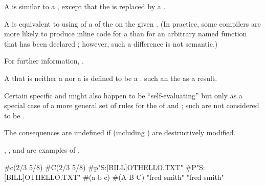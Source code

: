 \endsubsubsubsubsection%


A  is similar to a , except that
the  is replaced by a .

A  is equivalent to using  of a
 of the  on the given .
(In practice, some compilers are more likely to produce inline code 
for a  than for an arbitrary named function 
that has been declared ; however, such a difference
is not semantic.)

For further information, \seesection\LambdaExpressions.

\endsubsubsubsubsection%

\endsubsubsubsection%


A  that is neither a  nor a  is 
defined to be a .  
such an   the   
as a result.

Certain specific  and  might also happen 
to be ``self-evaluating'' but only as a special case of a more 
general set of rules for the  of  and
; such  are not considered to be
.

The consequences are undefined if  (including
) are destructively modified.


, , and  are examples of
.

 
 #c(2/3 5/8) \EV #C(2/3 5/8)
 #p"S:[BILL]OTHELLO.TXT" \EV #P"S:[BILL]OTHELLO.TXT"
 #(a b c) \EV #(A B C)
 "fred smith" \EV "fred smith"
\endcode

\endsubsubsubsubsection%

\endsubsubsubsection%

